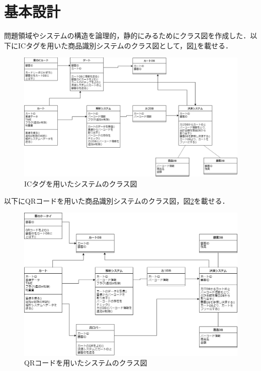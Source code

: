 


\section{基本設計}

問題領域やシステムの構造を論理的，静的にみるためにクラス図を作成した．以下にICタグを用いた商品識別システムのクラス図として，図\ref{class_ic}を載せる．

\begin{figure}[htbp]
\centering
\includegraphics[width=15cm]{./picture/class_ic.eps}
\caption{ICタグを用いたシステムのクラス図}
\label{class_ic}
\end{figure}


以下にQRコードを用いた商品識別システムのクラス図，図\ref{class_qr}を載せる．


\begin{figure}[htbp]
\centering
\includegraphics[width=15cm]{./picture/class_qr.eps}
\caption{QRコードを用いたシステムのクラス図}
\label{class_qr}
\end{figure}


